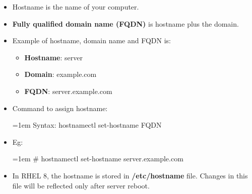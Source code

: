 \setlength{\columnsep}{3pt}
\begin{flushleft}
\bigskip


\begin{itemize}
	\item Hostname is the name of your computer.
	
	\item \textbf{Fully qualified domain name (FQDN)} is hostname plus the domain.
	
	\item Example of hostname, domain name and FQDN is:
	\begin{itemize}
		\item \textbf{Hostname}: server
		\item \textbf{Domain}: example.com
		\item \textbf{FQDN}: server.example.com
	\end{itemize}
	\bigskip
	\item Command to assign hostname:
	\begin{tcolorbox}[breakable,notitle,boxrule=-0pt,colback=pink,colframe=pink]
		\color{black}
		\font=1em
		Syntax: hostnamectl set-hostname FQDN
		\font=4pt
	\end{tcolorbox}
	\bigskip
	\item Eg:
	\begin{tcolorbox}[breakable,notitle,boxrule=-0pt,colback=black,colframe=black]
		\color{green}
		\font=1em
		\# hostnamectl set-hostname server.example.com
		\font=4pt
	\end{tcolorbox}
	\bigskip
	\item In RHEL 8, the hostname is stored in \textbf{/etc/hostname} file. Changes in this file will be reflected only after server reboot.
	
	

\end{itemize}



\end{flushleft}
\newpage


